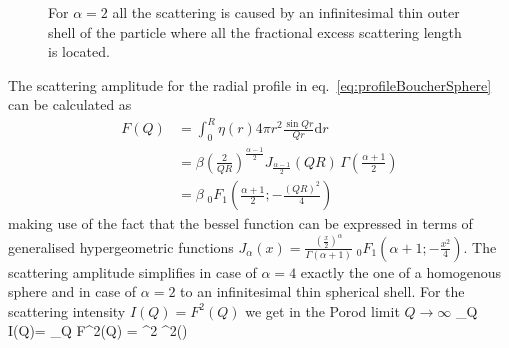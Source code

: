\begin{figure}[htb]
\begin{center}
\hfill
{}
\end{center}
\caption{For $\alpha=2$ all the scattering is caused by an infinitesimal thin outer shell of the particle where all the fractional excess scattering length is located.}
\label{fig:BoucherZr}
\end{figure}

The scattering amplitude for the radial profile in eq.\ \ref{eq:profileBoucherSphere} can be calculated as
\begin{align}
 F(Q) &= \int_0^R \eta(r) 4\pi r^2 \frac{\sin Qr}{Qr}\mathrm{d}r \nonumber \\
      &= \beta \left(\frac{2}{QR}\right)^{\frac{\alpha-1}{2}} J_{\frac{\alpha-1}{2}}(QR) \, \Gamma\left(\frac{\alpha+1}{2}\right) \nonumber \\
      &= \beta \;_0F_1\left(\frac{\alpha+1}{2};-\tfrac{(QR)^2}{4}\right)
\end{align}
making use of the fact that the bessel function can be expressed in terms of generalised hypergeometric functions $J_\alpha(x)=\frac{(\frac{x}{2})^\alpha}{\Gamma(\alpha+1)}  \;_0F_1 (\alpha+1; -\tfrac{x^2}{4})$. The scattering amplitude simplifies in case of $\alpha=4$ exactly the one of a homogenous sphere and in case of $\alpha=2$ to an infinitesimal thin spherical shell. For the scattering intensity $I(Q) = F^2(Q)$ we get in the Porod limit $Q\rightarrow\infty$
\BE
 \lim_{Q\rightarrow\infty} I(Q)= \lim_{Q\rightarrow\infty}  F^2(Q) =
 \beta^2  \Gamma^2\left(\right) 
\EE

